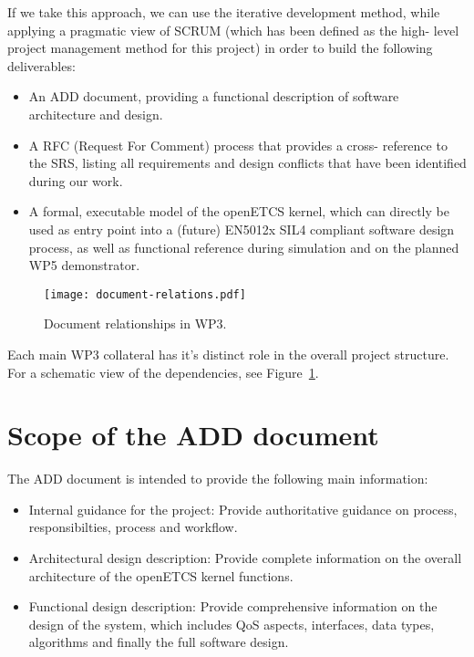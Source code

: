 If we take this approach, we can use the iterative development method, while applying a pragmatic view of SCRUM (which has been defined as the high- level project management method for this project) in order to build the following deliverables:

\begin{itemize}
\item An ADD document, providing a functional description of software architecture and design.
 
\item A RFC (Request For Comment) process that provides a cross- reference to the SRS, listing all requirements and design conflicts that have been identified during our work.
 
\item A formal, executable model of the openETCS kernel, which can directly be used as entry point into a (future) EN5012x SIL4 compliant software design process, as well as functional reference during simulation and on the planned WP5 demonstrator.
\end{itemize}
 
\begin{figure}
\centering
\texttt{[image: document-relations.pdf]}
\caption{Document relationships in WP3.}
\label{fig:doc-rels}
\end{figure}

Each main WP3 collateral has it's distinct role in the overall project structure. For a schematic view of the dependencies, see Figure~\ref{fig:doc-rels}.


\section{Scope of the ADD document}
 
The ADD document is intended to provide the following main information:

\begin{itemize}
\item Internal guidance for the project: Provide authoritative guidance on process, responsibilties, process and workflow.
 
\item Architectural design description: Provide complete information on the overall architecture of the openETCS kernel functions.

\item Functional design description: Provide comprehensive information on the design of the system, which includes QoS aspects, interfaces, data types, algorithms and finally the full software design.
\end{itemize}

